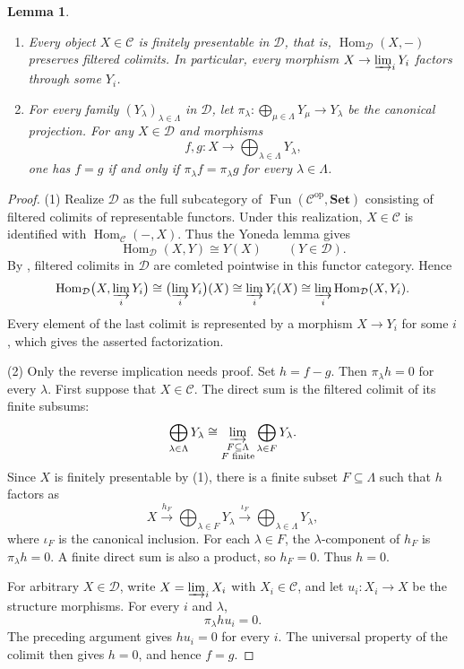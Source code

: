 \documentclass[11pt, a4paper]{article}
\numberwithin{equation}{section}
\newcommand{\C}{\mathcal C}
\newcommand{\D}{\mathcal D}
\newtheorem{lemma}[theorem]{Lemma}
\begin{document}
\begin{lemma}\label{pre:finite-presentability}
\begin{enumerate}
 \item Every object $X\in\C$ is finitely presentable in $\D$,
 that is, $\operatorname{Hom}_{\D}(X,-)$ preserves filtered colimits.
 In particular, every morphism $X\to\varinjlim_iY_i$  factors through some $Y_i$.
 \item For every family $(Y_\lambda)_{\lambda\in\Lambda}$ in $\D$,
let
$\pi_\lambda:\bigoplus_{\mu\in\Lambda}Y_\mu\longrightarrow Y_\lambda
$
be the canonical projection.
For any $X\in\D$ and morphisms
\[
 f,g:X\longrightarrow\bigoplus_{\lambda\in\Lambda}Y_\lambda,
\]
one has $f=g$ if and only if
$\pi_\lambda f=\pi_\lambda g$ for every $\lambda\in\Lambda$.
\end{enumerate}
\end{lemma}


\begin{proof}

\textup{(1)} Realize $\D$ as the full subcategory of
$\operatorname{Fun}(\C^{\mathrm{op}},\mathbf{Set})$ consisting of
filtered colimits of representable functors. Under this realization,
$X\in\C$ is identified with $\operatorname{Hom}_{\C}(-,X)$.
Thus the Yoneda lemma gives
\[
 \operatorname{Hom}_{\D}(X,Y)\cong Y(X)
 \qquad(Y\in\D).
\]
By \cite[Theorem~6.1.8]{KS06}, filtered colimits in $\D$ are
comleted pointwise in this functor category. Hence
\[
\begin{aligned}
 \operatorname{Hom}_{\D}\bigl(X,\varinjlim_i Y_i\bigr)
 \cong \bigl(\varinjlim_i Y_i\bigr)(X)
\cong \varinjlim_i Y_i(X)
 \cong \varinjlim_i\operatorname{Hom}_{\D}(X,Y_i).
\end{aligned}
\]
Every element of the last colimit is represented by a morphism
$X\to Y_i$ for some $i$, which gives the asserted factorization.


(2)
Only the reverse implication needs proof.
Set $h=f-g$. Then $\pi_\lambda h=0$ for every $\lambda$.
First suppose that $X\in\C$.
The direct sum is the filtered colimit of its finite subsums:
\[
 \bigoplus_{\lambda\in\Lambda}Y_\lambda
 \cong
 \varinjlim_{\substack{F\subseteq\Lambda\\F\text{ finite}}}
 \bigoplus_{\lambda\in F}Y_\lambda.
\]
Since $X$ is finitely presentable by \textup{(1)}, there is
a finite subset $F\subseteq\Lambda$ such that $h$ factors as
\[
 X\xrightarrow{h_F}\bigoplus_{\lambda\in F}Y_\lambda
 \xrightarrow{\iota_F}\bigoplus_{\lambda\in\Lambda}Y_\lambda,
\]
where $\iota_F$ is the canonical inclusion.
For each $\lambda\in F$, the $\lambda$-component of $h_F$
is $\pi_\lambda h=0$.
A finite direct sum is also a product, so $h_F=0$.
Thus $h=0$.

For arbitrary $X\in\D$, write
$X=\varinjlim_i X_i$ with $X_i\in\C$, and let
$u_i:X_i\to X$ be the structure morphisms.
For every $i$ and $\lambda$,
\[
 \pi_\lambda h u_i=0.
\]
The preceding argument gives $h u_i=0$ for every $i$.
The universal property of the colimit then gives $h=0$,
and hence $f=g$.
\end{proof}
\end{document}
